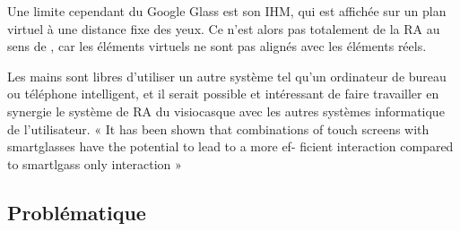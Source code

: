 Une limite cependant du Google Glass est son IHM, qui est affichée sur un plan virtuel à une distance fixe des yeux. Ce n'est alors pas totalement de la RA au sens de \citet{AzumaBaillotBehringerEtAl2001}, car les éléments virtuels ne sont pas alignés avec les éléments réels.

Les mains sont libres d'utiliser un autre système tel qu'un ordinateur de bureau ou téléphone intelligent, et il serait possible et intéressant de faire travailler en synergie le système de RA du visiocasque avec les autres systèmes informatique de l'utilisateur. \citep{SerranoEnsYangEtAl2015a} \citep{SerranoEnsYangEtAl2015}
« It has been shown that combinations of touch screens
with smartglasses have the potential to lead to a more ef-
ficient interaction compared to smartlgass only interaction » \cite{GrubertKranzQuigley2015}


\subsection*{Problématique}




